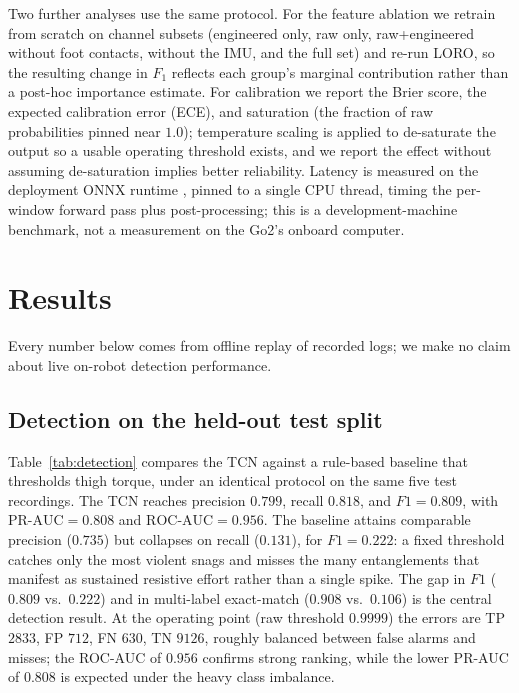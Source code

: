 \documentclass[conference]{IEEEtran}
\begin{document}
Two further analyses use the same protocol. For the feature ablation we retrain from scratch on channel subsets (engineered only, raw only, raw+engineered without foot contacts, without the IMU, and the full set) and re-run LORO, so the resulting change in $F_1$ reflects each group's marginal contribution rather than a post-hoc importance estimate. For calibration we report the Brier score, the expected calibration error (ECE), and saturation (the fraction of raw probabilities pinned near $1.0$); temperature scaling \cite{guo2017calibration,niculescu2005predicting} is applied to de-saturate the output so a usable operating threshold exists, and we report the effect without assuming de-saturation implies better reliability. Latency is measured on the deployment ONNX runtime \cite{onnxruntime}, pinned to a single CPU thread, timing the per-window forward pass plus post-processing; this is a development-machine benchmark, not a measurement on the Go2's onboard computer.

\section{Results}

Every number below comes from offline replay of recorded logs; we make no claim about live on-robot detection performance.

\subsection{Detection on the held-out test split}
Table~\ref{tab:detection} compares the TCN against a rule-based baseline that thresholds thigh torque, under an identical protocol on the same five test recordings. The TCN reaches precision $0.799$, recall $0.818$, and $F1 = 0.809$, with $\text{PR-AUC} = 0.808$ and $\text{ROC-AUC} = 0.956$. The baseline attains comparable precision ($0.735$) but collapses on recall ($0.131$), for $F1 = 0.222$: a fixed threshold catches only the most violent snags and misses the many entanglements that manifest as sustained resistive effort rather than a single spike. The gap in $F1$ ($0.809$ vs.\ $0.222$) and in multi-label exact-match ($0.908$ vs.\ $0.106$) is the central detection result. At the operating point (raw threshold $0.9999$) the errors are TP $2833$, FP $712$, FN $630$, TN $9126$, roughly balanced between false alarms and misses; the ROC-AUC of $0.956$ confirms strong ranking, while the lower PR-AUC of $0.808$ is expected under the heavy class imbalance.
\end{document}
